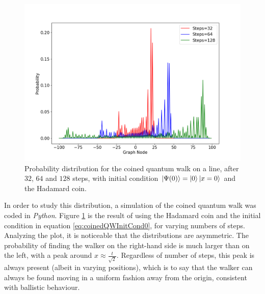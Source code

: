 \documentclass[../../dissertation.tex]{subfiles}
\begin{document}
\begin{figure}[!h]
	\centering
	\includegraphics[scale=0.40]{img/CoinedQuantumWalk/CoinedMultiple_psi0_3264128.png}
	\caption{Probability distribution for the coined quantum walk on a line, after $32$, $64$ and $128$ steps, with initial condition $\ket{\Psi(0)}=\ket{0}\ket{x=0}$ and the Hadamard coin.} 
	\label{fig:coinedQWDist0}
\end{figure}
In order to study this distribution, a simulation of the coined quantum walk
was coded in \textit{Python}. Figure \ref{fig:coinedQWDist0} is the result of
using the Hadamard coin and the initial condition in equation
\ref{eq:coinedQWInitCond0}, for varying numbers of steps. Analyzing the plot,
it is noticeable that the distributions are asymmetric. The probability of
finding the walker on the right-hand side is much larger than on the left, with
a peak around $x \approx \frac{t}{\sqrt{2}}$. Regardless of number of steps,
this peak is always present (albeit in varying positions), which is to say that
the walker can always be found moving in a uniform fashion away from the
origin, consistent with ballistic behaviour.\par 
\end{document}
